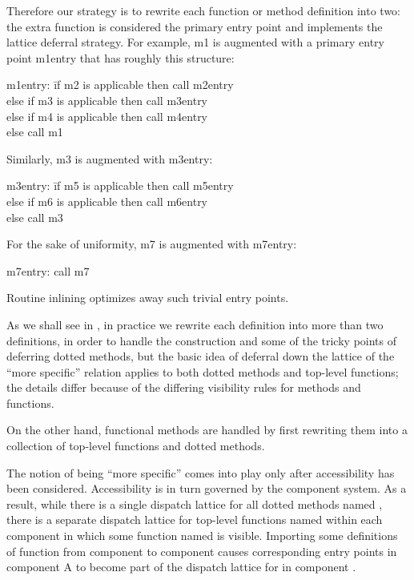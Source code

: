 Therefore our strategy is to rewrite each function or method definition into two:
the extra function is considered the primary entry point and implements the lattice deferral strategy.
For example, m1 is augmented with a primary entry point m1entry that has roughly this structure:
\begin{tabbing}
m1entry: \= if m2 is applicable then call m2entry \\
\>else if m3 is applicable then call m3entry \\
\>else if m4 is applicable then call m4entry \\
\>else call m1
\end{tabbing}
Similarly, m3 is augmented with m3entry:
\begin{tabbing}
m3entry: \= if m5 is applicable then call m5entry \\
\>else if m6 is applicable then call m6entry \\
\>else call m3
\end{tabbing}
For the sake of uniformity, m7 is augmented with m7entry:
\begin{tabbing}
m7entry: call m7
\end{tabbing}
Routine inlining optimizes away such trivial entry points.

As we shall see in ,
in practice we rewrite each definition into more than two definitions,
in order to handle the  construction and some of the tricky points of
deferring dotted methods, but the basic idea of deferral down the lattice
of the ``more specific'' relation applies to both dotted methods
and top-level functions; the details differ because of the differing visibility
rules for methods and functions.

On the other hand, functional methods are handled by first rewriting them
into a collection of top-level functions and dotted methods.

The notion of being ``more specific'' comes into play only after
accessibility has been considered.  Accessibility is in turn governed
by the component system.  As a result, while there is a single dispatch
lattice for all dotted methods named ,
there is a separate dispatch lattice for top-level functions named 
within each component in which some function named  is visible.
Importing some definitions of function  from component  to component 
causes corresponding entry points in component A to become part of the
dispatch lattice for  in component .


